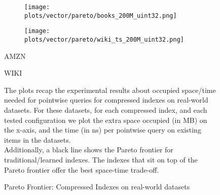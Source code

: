 \documentclass{article}
\begin{document}
\begin{figure}[!htbp]
{\begin{minipage}[t][0.98\textheight][t]{\textwidth}
    \begin{minipage}{0.48\linewidth}
        \begin{figure}[H]
        \texttt{[image: plots/vector/pareto/books\_200M\_uint32.png]}
        \end{figure}
    \end{minipage}
    \begin{minipage}{0.48\linewidth}
        \begin{figure}[H]
        \texttt{[image: plots/vector/pareto/wiki\_ts\_200M\_uint32.png]}
        \end{figure}
    \end{minipage}
    \begin{minipage}{0.48\linewidth}
    \begin{center}
        AMZN
    \end{center}
    \end{minipage}
    \begin{minipage}{0.48\linewidth}
    \begin{center}
        WIKI
    \end{center}
    \end{minipage}

    \vfill
    
    \begin{minipage}{\linewidth}
        The plots recap the experimental results about occupied space/time needed for pointwise queries for compressed indexes on real-world datasets. For these datasets, for each compressed index, and each tested configuration we plot the extra space occupied (in MB) on the x-axis, and the time (in ns) per pointwise query on existing items in the datasets. \\

    Additionally, a black line shows the Pareto frontier for traditional/learned indexes. The indexes that sit on top of the Pareto frontier offer the best space-time trade-off. 
            \end{minipage}
    \vspace{10px}
\end{minipage}
}
\caption{Pareto Frontier: Compressed Indexes on real-world datasets}
\end{figure}
\end{document}
